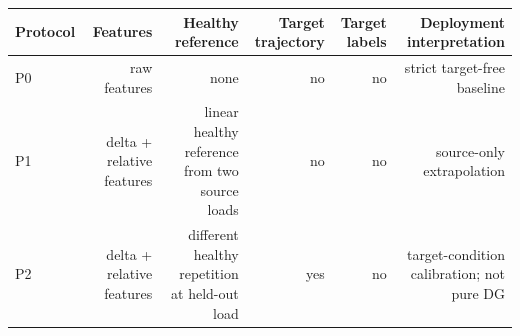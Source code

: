 \begin{tabular}{lrrrrr}
\hline
Protocol & Features & Healthy reference & Target trajectory & Target labels & Deployment interpretation \\
\hline
P0 & raw features & none & no & no & strict target-free baseline \\
P1 & delta + relative features & linear healthy reference from two source loads & no & no & source-only extrapolation \\
P2 & delta + relative features & different healthy repetition at held-out load & yes & no & target-condition calibration; not pure DG \\
\hline
\end{tabular}
